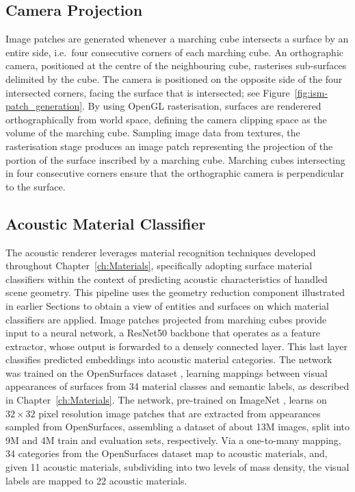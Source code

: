 \subsection{Camera Projection}
Image patches are generated whenever a marching cube intersects a surface by an entire side, i.e.\ four consecutive corners of each marching cube. An orthographic camera, positioned at the centre of the neighbouring cube, rasterises sub-surfaces delimited by the cube. The camera is positioned on the opposite side of the four intersected corners, facing the surface that is intersected; see Figure~\ref{fig:ism-patch_generation}. 
By using OpenGL rasterisation, surfaces are renderered orthographically from world space, defining the camera clipping space as the volume of the marching cube. Sampling image data from textures, the rasterisation stage produces an image patch representing the projection of the portion of the surface inscribed by a marching cube. Marching cubes intersecting in four consecutive corners ensure that the orthographic camera is perpendicular to the surface.\par

\subsection{Acoustic Material Classifier}
The acoustic renderer leverages material recognition techniques developed throughout Chapter~\ref{ch:Materials}, specifically adopting surface material classifiers within the context of predicting acoustic characteristics of handled scene geometry. This pipeline uses the geometry reduction component illustrated in earlier Sections to obtain a view of entities and surfaces on which material classifiers are applied.
Image patches projected from marching cubes provide input to a neural network, a ResNet50 \citep{he2016deep} backbone that operates as a feature extractor, whose output is forwarded to a densely connected layer. This last layer classifies predicted embeddings into acoustic material categories. The network was trained on the OpenSurfaces dataset \citep{bell2013opensurfaces}, learning mappings between visual appearances of surfaces from 34 material classes and semantic labels, as described in Chapter~\ref{ch:Materials}. The network, pre-trained on ImageNet \citep{deng2009imagenet}, learns on $32\times32$ pixel resolution image patches that are extracted from appearances sampled from OpenSurfaces, assembling a dataset of about 13M images, split into 9M and 4M train and evaluation sets, respectively. Via a one-to-many mapping, 34 categories from the OpenSurfaces dataset map to acoustic materials, and, given 11 acoustic materials, subdividing into two levels of mass density, the visual labels are mapped to 22 acoustic materials.\par

